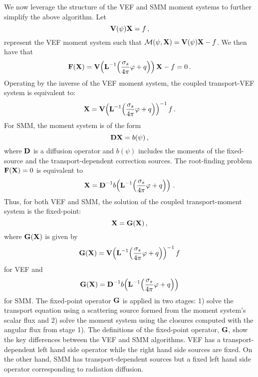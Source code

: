 \documentclass[../doc.tex]{subfiles}
\begin{document}
We now leverage the structure of the VEF and SMM moment systems to further simplify the above algorithm. 
Let 
	\begin{equation}
		\boldsymbol{\mathrm{V}}(\psi)\boldsymbol{\mathrm{X}} = f \,, 
	\end{equation}
represent the VEF moment system such that $\mathcal{M}(\psi,\boldsymbol{\mathrm{X}}) = \boldsymbol{\mathrm{V}}(\psi)\boldsymbol{\mathrm{X}} - f$. We then have that 
	\begin{equation}
		\boldsymbol{\mathrm{F}}(\boldsymbol{\mathrm{X}}) = \boldsymbol{\mathrm{V}}\!\left( \boldsymbol{\mathrm{L}}^{-1}\!\left( \frac{\sigma_s}{4\pi}\varphi + q \right) \right) \boldsymbol{\mathrm{X}} - f = 0 \,. 
	\end{equation}
Operating by the inverse of the VEF moment system, the coupled transport-VEF system is equivalent to: 
	\begin{equation} \label{moment:vef_iter}
		\boldsymbol{\mathrm{X}} = \boldsymbol{\mathrm{V}}\!\left( \boldsymbol{\mathrm{L}}^{-1}\!\left( \frac{\sigma_s}{4\pi}\varphi + q \right) \right)^{-1} f \,. 
	\end{equation}
For SMM, the moment system is of the form
	\begin{equation}
		\boldsymbol{\mathrm{D}}\boldsymbol{\mathrm{X}} = b(\psi) \,,
	\end{equation}
where $\boldsymbol{\mathrm{D}}$ is a diffusion operator and $b(\psi)$ includes the moments of the fixed-source and the transport-dependent correction sources. The root-finding problem $\boldsymbol{\mathrm{F}}(\boldsymbol{\mathrm{X}}) = 0$ is equivalent to 
	\begin{equation} \label{moment:smm_iter}
		\boldsymbol{\mathrm{X}} = \boldsymbol{\mathrm{D}}^{-1}b\!\left( \boldsymbol{\mathrm{L}}^{-1}\!\left( \frac{\sigma_s}{4\pi}\varphi + q \right) \right) \,. 
	\end{equation}
Thus, for both VEF and SMM, the solution of the coupled transport-moment system is the fixed-point: 
	\begin{equation} \label{moment:G}
		\boldsymbol{\mathrm{X}} = \boldsymbol{\mathrm{G}}(\boldsymbol{\mathrm{X}}) \,,
	\end{equation}
where $\boldsymbol{\mathrm{G}}(\boldsymbol{\mathrm{X}})$ is given by 
	\begin{equation} \label{moment:vef_fp}
		\boldsymbol{\mathrm{G}}(\boldsymbol{\mathrm{X}}) = \boldsymbol{\mathrm{V}}\!\left( \boldsymbol{\mathrm{L}}^{-1}\!\left( \frac{\sigma_s}{4\pi}\varphi + q \right) \right)^{-1} f
	\end{equation}
for VEF and 
	\begin{equation} \label{moment:smm_fp}
		\boldsymbol{\mathrm{G}}(\boldsymbol{\mathrm{X}}) = \boldsymbol{\mathrm{D}}^{-1}b\!\left( \boldsymbol{\mathrm{L}}^{-1}\!\left( \frac{\sigma_s}{4\pi}\varphi + q \right) \right)
	\end{equation}
for SMM.
The fixed-point operator $\boldsymbol{\mathrm{G}}$ is applied in two stages: 1) solve the transport equation using a scattering source formed from the moment system's scalar flux and 2) solve the moment system using the closures computed with the angular flux from stage 1). The definitions of the fixed-point operator, $\boldsymbol{\mathrm{G}}$, show the key differences between the VEF and SMM algorithms. VEF has a transport-dependent left hand side operator while the right hand side sources are fixed. On the other hand, SMM has transport-dependent sources but a fixed left hand side operator corresponding to radiation diffusion. 
\end{document}
